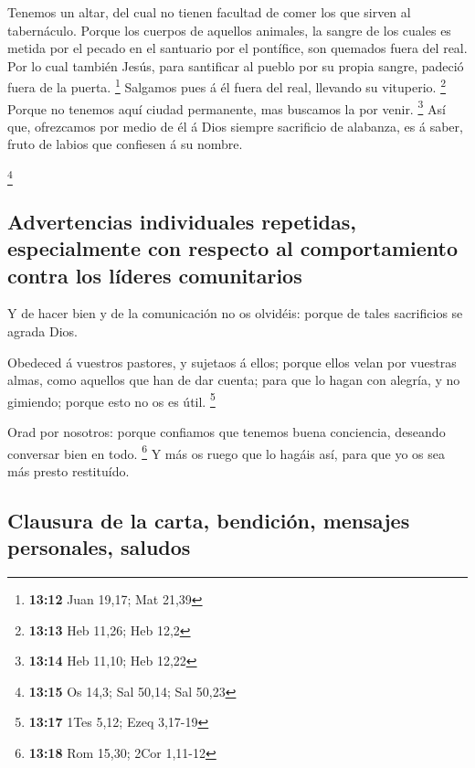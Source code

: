 Tenemos un altar, del cual no tienen facultad de comer los
que sirven al tabernáculo.  Porque los cuerpos de aquellos
animales, la sangre de los cuales es metida por el pecado en el
santuario por el pontífice, son quemados fuera del real. 
Por lo cual también Jesús, para santificar al pueblo por su propia
sangre, padeció fuera de la puerta. \footnote{\textbf{13:12} Juan 19,17;
  Mat 21,39}  Salgamos pues á él fuera del real, llevando
su vituperio. \footnote{\textbf{13:13} Heb 11,26; Heb 12,2}
 Porque no tenemos aquí ciudad permanente, mas buscamos la
por venir. \footnote{\textbf{13:14} Heb 11,10; Heb 12,22} 
Así que, ofrezcamos por medio de él á Dios siempre sacrificio de
alabanza, es á saber, fruto de labios que confiesen á su nombre.

\footnote{\textbf{13:15} Os 14,3; Sal 50,14; Sal 50,23}

\hypertarget{advertencias-individuales-repetidas-especialmente-con-respecto-al-comportamiento-contra-los-luxedderes-comunitarios}{%
\subsection{Advertencias individuales repetidas, especialmente con
respecto al comportamiento contra los líderes
comunitarios}\label{advertencias-individuales-repetidas-especialmente-con-respecto-al-comportamiento-contra-los-luxedderes-comunitarios}}

 Y de hacer bien y de la comunicación no os olvidéis:
porque de tales sacrificios se agrada Dios.

 Obedeced á vuestros pastores, y sujetaos á ellos; porque
ellos velan por vuestras almas, como aquellos que han de dar cuenta;
para que lo hagan con alegría, y no gimiendo; porque esto no os es útil.
\footnote{\textbf{13:17} 1Tes 5,12; Ezeq 3,17-19}

 Orad por nosotros: porque confiamos que tenemos buena
conciencia, deseando conversar bien en todo. \footnote{\textbf{13:18}
  Rom 15,30; 2Cor 1,11-12}  Y más os ruego que lo hagáis
así, para que yo os sea más presto restituído.

\hypertarget{clausura-de-la-carta-bendiciuxf3n-mensajes-personales-saludos}{%
\subsection{Clausura de la carta, bendición, mensajes personales,
saludos}\label{clausura-de-la-carta-bendiciuxf3n-mensajes-personales-saludos}}


